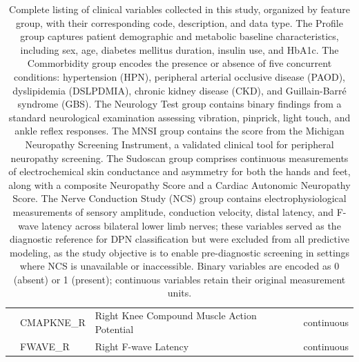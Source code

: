 \documentclass[pdflatex,sn-vancouver-num]{sn-jnl}
\begin{document}
\begin{table}[h!]
\begin{tabular}{llll}
 & CMAPKNE\_R & Right Knee Compound Muscle Action Potential & continuous  \\
 & FWAVE\_R & Right F-wave Latency & continuous  \\
\bottomrule
\end{tabular}
\caption{
 Complete listing of clinical variables collected in this study, organized by feature group, with their corresponding code, description, and data type. The Profile group captures patient demographic and metabolic baseline characteristics, including sex, age, diabetes mellitus duration, insulin use, and HbA1c. The Commorbidity group encodes the presence or absence of five concurrent conditions: hypertension (HPN), peripheral arterial occlusive disease (PAOD), dyslipidemia (DSLPDMIA), chronic kidney disease (CKD), and Guillain-Barré syndrome (GBS). The Neurology Test group contains binary findings from a standard neurological examination assessing vibration, pinprick, light touch, and ankle reflex responses. The MNSI group contains the score from the Michigan Neuropathy Screening Instrument, a validated clinical tool for peripheral neuropathy screening. The Sudoscan group comprises continuous measurements of electrochemical skin conductance and asymmetry for both the hands and feet, along with a composite Neuropathy Score and a Cardiac Autonomic Neuropathy Score. The Nerve Conduction Study (NCS) group contains electrophysiological measurements of sensory amplitude, conduction velocity, distal latency, and F-wave latency across bilateral lower limb nerves; these variables served as the diagnostic reference for DPN classification but were excluded from all predictive modeling, as the study objective is to enable pre-diagnostic screening in settings where NCS is unavailable or inaccessible. Binary variables are encoded as 0 (absent) or 1 (present); continuous variables retain their original measurement units.
}
\label{tab:clinical_data}
\end{table}
\end{document}
